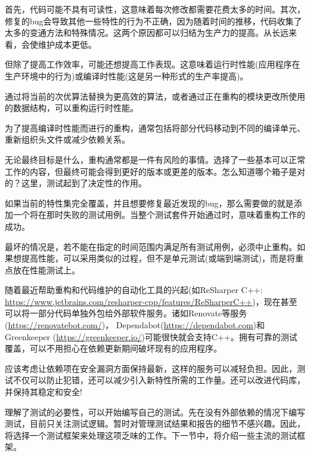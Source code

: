 首先，代码可能不具有可读性，这意味着每次修改都需要花费太多的时间。其次，修复的bug会导致其他一些特性的行为不正确，因为随着时间的推移，代码收集了太多的变通方法和特殊情况。这两个原因都可以归结为生产力的提高。从长远来看，会使维护成本更低。

但除了提高工作效率，可能还想提高工作表现。这意味着运行时性能(应用程序在生产环境中的行为)或编译时性能(这是另一种形式的生产率提高)。

通过将当前的次优算法替换为更高效的算法，或者通过正在重构的模块更改所使用的数据结构，可以重构运行时性能。

为了提高编译时性能而进行的重构，通常包括将部分代码移动到不同的编译单元、重新组织头文件或减少依赖关系。

无论最终目标是什么，重构通常都是一件有风险的事情。选择了一些基本可以正常工作的内容，但最终可能会得到更好的版本或更差的版本。怎么知道哪个箱子是对的？这里，测试起到了决定性的作用。

如果当前的特性集完全覆盖，并且想要修复最近发现的bug，那么需要做的就是添加一个将在那时失败的测试用例。当整个测试套件开始通过时，意味着重构工作的成功。

最坏的情况是，若不能在指定的时间范围内满足所有测试用例，必须中止重构。如果想提高性能，可以采用类似的过程，但不是单元测试(或端到端测试)，而是将重点放在性能测试上。

随着最近帮助重构和代码维护的自动化工具的兴起(如ReSharper C++: \url{https://www.jetbrains.com/resharper-cpp/features/ReSharperC++})，现在甚至可以将一部分代码单独外包给外部软件服务。诸如Renovate等服务(\url{https://renovatebot.com/})， Dependabot(\url{https://dependabot.com})和Greenkeeper (\url{https://greenkeeper.io/})可能很快就会支持C++。拥有可靠的测试覆盖，可以不用担心在依赖更新期间破坏现有的应用程序。

应该考虑让依赖项在安全漏洞方面保持最新，这样的服务可以减轻负担。因此，测试不仅可以防止犯错，还可以减少引入新特性所需的工作量。还可以改进代码库，并保持其稳定和安全!

理解了测试的必要性，可以开始编写自己的测试。先在没有外部依赖的情况下编写测试，目前只关注测试逻辑。暂时对管理测试结果和报告的细节不感兴趣。因此，将选择一个测试框架来处理这项乏味的工作。下一节中，将介绍一些主流的测试框架。















